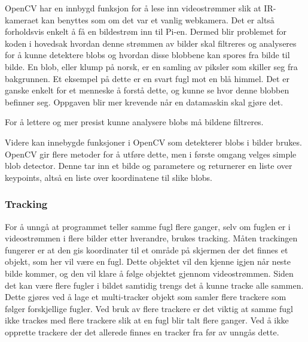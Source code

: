 OpenCV  har en innbygd funksjon for å lese inn videostrømmer slik at IR-kameraet kan benyttes som om det var et vanlig webkamera. Det er altså forholdsvis enkelt å få en bildestrøm inn til Pi-en. Dermed blir problemet for koden i hovedsak hvordan denne strømmen av bilder skal filtreres og analyseres for å kunne detektere blobs og hvordan disse blobbene kan spores fra bilde til bilde. En blob, eller klump på norsk, er en samling av piksler som skiller seg fra bakgrunnen. Et eksempel på dette er en svart fugl mot en blå himmel. Det er ganske enkelt for et menneske å forstå dette, og kunne se hvor denne blobben befinner seg. Oppgaven blir mer krevende når en datamaskin skal gjøre det. 

For å lettere og mer presist kunne analysere blobs må bildene filtreres.


Videre kan innebygde funksjoner i OpenCV som  detekterer blobs i bilder brukes. OpenCV gir flere metoder for å utføre dette, men i første omgang velges simple blob detector. Denne tar inn et bilde og parametere  og returnerer en liste over keypoints, altså en liste over koordinatene til slike blobs.


\subsubsection{Tracking}
\label{subsubsec:tracking}
For å unngå at programmet teller samme fugl flere ganger, selv om fuglen er i videostrømmen i flere bilder etter hverandre, brukes tracking. Måten trackingen fungerer er at den gis koordinater til et område på skjermen der det finnes et objekt, som her vil være en fugl. Dette objektet vil den kjenne igjen når neste bilde kommer, og den vil klare å følge objektet gjennom videostrømmen.
Siden det kan være flere fugler i bildet samtidig trengs det å kunne tracke alle sammen. Dette gjøres ved å lage et multi-tracker objekt som samler flere trackere som følger forskjellige fugler. Ved bruk av flere trackere er det viktig at samme fugl ikke trackes med flere trackere slik at en fugl blir talt flere ganger. Ved å ikke opprette trackere der det allerede finnes en tracker fra før av unngås dette. 

